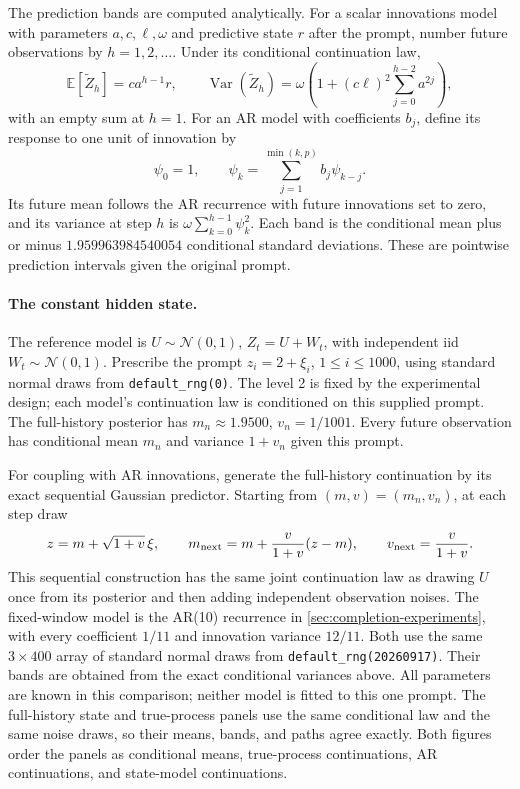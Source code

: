 \documentclass[11pt,twoside]{article}
\newcommand{\E}{\mathbb E}
\theoremstyle{definition}
\theoremstyle{remark}
\begin{document}
The prediction bands are computed analytically. For a scalar innovations
model with parameters \(a,c,\ell,\omega\) and predictive state \(r\)
after the prompt, number future observations by \(h=1,2,\ldots\).
Under its conditional continuation law,
\[
 \E[\widetilde Z_h]=ca^{h-1}r,\qquad
 \operatorname{Var}(\widetilde Z_h)
 =\omega\left(1+(c\ell)^2\sum_{j=0}^{h-2}a^{2j}\right),
\]
with an empty sum at \(h=1\). For an AR model with coefficients \(b_j\),
define its response to one unit of innovation by
\[
 \psi_0=1,\qquad
 \psi_k=\sum_{j=1}^{\min(k,p)}b_j\psi_{k-j}.
\]
Its future mean follows the AR recurrence with future innovations set to
zero, and its variance at step \(h\) is
\(\omega\sum_{k=0}^{h-1}\psi_k^2\).
Each band is the conditional mean plus or minus
\(1.959963984540054\) conditional standard deviations.
These are pointwise prediction intervals given the original prompt.

\paragraph{The constant hidden state.}
The reference model is \(U\sim\mathcal N(0,1)\),
\(Z_t=U+W_t\), with independent iid \(W_t\sim\mathcal N(0,1)\).
Prescribe the prompt \(z_i=2+\xi_i\), \(1\le i\le1000\), using
standard normal draws from \texttt{default\_rng(0)}.
The level 2 is fixed by the experimental design; each model's continuation
law is conditioned on this supplied prompt. The full-history posterior
has \(m_n\approx1.9500\), \(v_n=1/1001\).
Every future observation has conditional mean \(m_n\) and variance
\(1+v_n\) given this prompt.

For coupling with AR innovations, generate the full-history continuation
by its exact sequential Gaussian predictor. Starting from \((m,v)=(m_n,v_n)\),
at each step draw
\[
 z=m+\sqrt{1+v}\,\xi,\qquad
 m_{\rm next}=m+\frac{v}{1+v}(z-m),\qquad
 v_{\rm next}=\frac{v}{1+v}.
\]
This sequential construction has the same joint continuation law as drawing \(U\) once from its
posterior and then adding independent observation noises.
The fixed-window model is the AR(10) recurrence in
\cref{sec:completion-experiments}, with every coefficient \(1/11\)
and innovation variance \(12/11\). Both use the same \(3\times400\)
array of standard normal draws from \texttt{default\_rng(20260917)}.
Their bands are obtained from the exact conditional variances above.
All parameters are known in this comparison; neither model is fitted
to this one prompt.
The full-history state and true-process panels use the same conditional
law and the same noise draws, so their means, bands, and paths agree
exactly. Both figures order the panels as conditional means, true-process
continuations, AR continuations, and state-model continuations.
\end{document}
